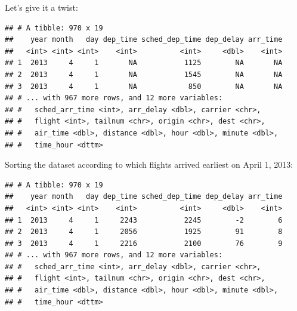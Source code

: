 \documentclass[]{book}
\newenvironment{Shaded}{}{}
\newcommand{\DecValTok}[1]{#1}
\newcommand{\KeywordTok}[1]{\textcolor[rgb]{0.00,0.00,1.00}{#1}}
\newcommand{\NormalTok}[1]{#1}
\newcommand{\OperatorTok}[1]{#1}
\newcommand{\StringTok}[1]{\textcolor[rgb]{0.00,0.50,0.50}{#1}}
\begin{document}
Let's give it a twist:

\begin{Shaded}
\end{Shaded}

\begin{verbatim}
## # A tibble: 970 x 19
##    year month   day dep_time sched_dep_time dep_delay arr_time
##   <int> <int> <int>    <int>          <int>     <dbl>    <int>
## 1  2013     4     1       NA           1125        NA       NA
## 2  2013     4     1       NA           1545        NA       NA
## 3  2013     4     1       NA            850        NA       NA
## # ... with 967 more rows, and 12 more variables:
## #   sched_arr_time <int>, arr_delay <dbl>, carrier <chr>,
## #   flight <int>, tailnum <chr>, origin <chr>, dest <chr>,
## #   air_time <dbl>, distance <dbl>, hour <dbl>, minute <dbl>,
## #   time_hour <dttm>
\end{verbatim}

Sorting the dataset according to which flights arrived earliest on April 1, 2013:

\begin{Shaded}
\end{Shaded}

\begin{verbatim}
## # A tibble: 970 x 19
##    year month   day dep_time sched_dep_time dep_delay arr_time
##   <int> <int> <int>    <int>          <int>     <dbl>    <int>
## 1  2013     4     1     2243           2245        -2        6
## 2  2013     4     1     2056           1925        91        8
## 3  2013     4     1     2216           2100        76        9
## # ... with 967 more rows, and 12 more variables:
## #   sched_arr_time <int>, arr_delay <dbl>, carrier <chr>,
## #   flight <int>, tailnum <chr>, origin <chr>, dest <chr>,
## #   air_time <dbl>, distance <dbl>, hour <dbl>, minute <dbl>,
## #   time_hour <dttm>
\end{verbatim}
\end{document}
